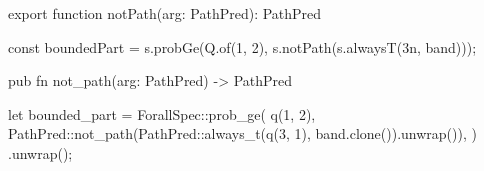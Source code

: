 \begin{tssrc}
export function notPath(arg: PathPred): PathPred
\end{tssrc}
\begin{tssrc}
const boundedPart = s.probGe(Q.of(1, 2), s.notPath(s.alwaysT(3n, band)));
\end{tssrc}
\begin{rustsrc}
pub fn not_path(arg: PathPred) -> PathPred
\end{rustsrc}
\begin{rustsrc}
let bounded_part = ForallSpec::prob_ge(
    q(1, 2),
    PathPred::not_path(PathPred::always_t(q(3, 1), band.clone()).unwrap()),
)
.unwrap();
\end{rustsrc}
